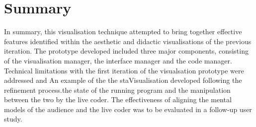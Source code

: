 




\section{Summary}

In summary, this visualisation technique attempted to bring together effective features identified within the aesthetic and didactic visualisations of the previous iteration. The prototype developed included three major components, consisting of the visualisation manager, the interface manager and the code manager. Technical limitations with the first iteration of the visualsation prototype were addressed and  An example of the the staVisualisation developed following the refinement process.the state of the running program and the manipulation between the two by the live coder. The effectiveness of aligning the mental models of the audience and the live coder was to be evaluated in a follow-up user study.



